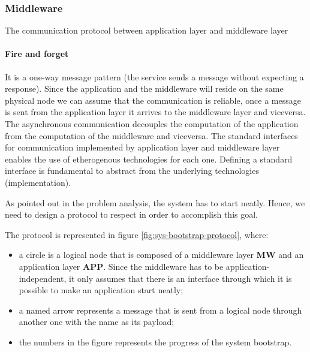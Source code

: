 \subsubsection{Middleware}
The communication protocol between application layer and middleware layer 
\paragraph{Fire and forget} 
It is a one-way message pattern (the service sends a message without expecting a response). 
Since the application and the middleware will reside on the same physical node we can assume 
that the communication is reliable, once a message is sent from the application layer it arrives to 
the middleware layer and viceversa.
The asynchronous communication decouples the computation of the application from the 
computation of the middleware and viceversa. The standard interfaces for communication 
implemented by application layer and middleware layer enables the use of etherogenous 
technologies for each one. Defining a standard interface is fundamental to abstract from 
the underlying technologies (implementation).


As pointed out in the problem analysis, the system has to start neatly. Hence,
we need to design a protocol to respect in order to accomplish this goal.

The protocol is represented in figure \ref{fig:sys-bootstrap-protocol}, where:

\begin{itemize}
  \item a circle is a logical node that is composed of a middleware layer
    \textbf{MW} and an application layer \textbf{APP}. Since the middleware
    has to be application-independent, it only assumes that there is an
    interface through which it is possible to make an application start neatly;
  \item a named arrow represents a message that is sent from a logical node
    through another one with the name as its payload;
  \item the numbers in the figure represents the progress of the system
    bootstrap.
\end{itemize}

